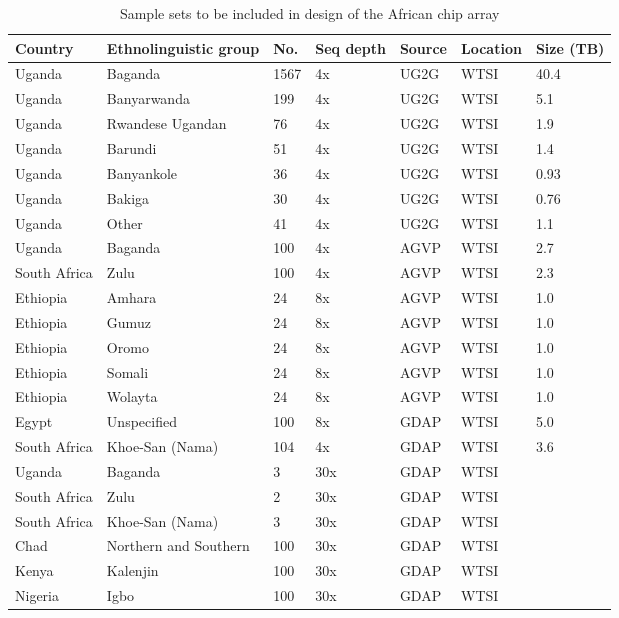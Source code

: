 \begin{landscape}
\begin{longtable}{lllllll}
\caption{Sample sets to be included in design of the African chip array}
\label{samples}
\hline
Country & Ethnolinguistic group & No. & Seq depth & Source & Location & Size (TB) \\
\hline
\endhead %
Uganda & Baganda & 1567 & 4x & UG2G & WTSI & 40.4 \\
Uganda & Banyarwanda & 199 & 4x & UG2G & WTSI & 5.1 \\
Uganda & Rwandese Ugandan & 76 & 4x & UG2G & WTSI & 1.9 \\
Uganda & Barundi & 51 & 4x & UG2G & WTSI & 1.4 \\
Uganda & Banyankole & 36 & 4x & UG2G & WTSI & 0.93 \\
Uganda & Bakiga & 30 & 4x & UG2G & WTSI & 0.76 \\
Uganda & Other & 41 & 4x & UG2G & WTSI & 1.1 \\
Uganda & Baganda & 100 & 4x & AGVP & WTSI & 2.7 \\
South Africa & Zulu & 100 & 4x & AGVP & WTSI & 2.3 \\
Ethiopia & Amhara & 24 & 8x & AGVP & WTSI & 1.0 \\
Ethiopia & Gumuz & 24 & 8x & AGVP & WTSI & 1.0 \\
Ethiopia & Oromo & 24 & 8x & AGVP & WTSI & 1.0 \\
Ethiopia & Somali & 24 & 8x & AGVP & WTSI & 1.0 \\
Ethiopia & Wolayta & 24 & 8x & AGVP & WTSI & 1.0 \\
Egypt & Unspecified & 100 & 8x & GDAP & WTSI & 5.0 \\
South Africa & Khoe-San (Nama) & 104 & 4x & GDAP & WTSI & 3.6 \\
Uganda & Baganda & 3 & 30x & GDAP & WTSI \\
South Africa & Zulu & 2 & 30x & GDAP & WTSI \\
South Africa & Khoe-San (Nama) & 3 & 30x & GDAP & WTSI \\
Chad & Northern and Southern & 100 & 30x & GDAP & WTSI \\
Kenya & Kalenjin & 100 & 30x & GDAP & WTSI \\
Nigeria & Igbo & 100 & 30x & GDAP & WTSI \\

\end{longtable}
\end{landscape}
